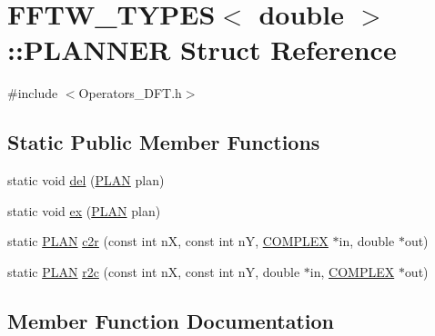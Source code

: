 \hypertarget{struct_f_f_t_w___t_y_p_e_s_3_01double_01_4_1_1_p_l_a_n_n_e_r}{}\section{F\+F\+T\+W\+\_\+\+T\+Y\+P\+E\+S$<$ double $>$\+:\+:P\+L\+A\+N\+N\+E\+R Struct Reference}
\label{struct_f_f_t_w___t_y_p_e_s_3_01double_01_4_1_1_p_l_a_n_n_e_r}


{\ttfamily \#include $<$Operators\+\_\+\+D\+F\+T.\+h$>$}

\subsection*{Static Public Member Functions}
\begin{DoxyCompactItemize}
\item 
static void \hyperlink{struct_f_f_t_w___t_y_p_e_s_3_01double_01_4_1_1_p_l_a_n_n_e_r_a8231993edffd6320aa232b1ceeb6c419}{del} (\hyperlink{struct_f_f_t_w___t_y_p_e_s_3_01double_01_4_a19c1538d166a5a9f01680c00253850ac}{P\+L\+A\+N} plan)
\item 
static void \hyperlink{struct_f_f_t_w___t_y_p_e_s_3_01double_01_4_1_1_p_l_a_n_n_e_r_afb9a4683a3d7eae99d24810d42c99d7a}{ex} (\hyperlink{struct_f_f_t_w___t_y_p_e_s_3_01double_01_4_a19c1538d166a5a9f01680c00253850ac}{P\+L\+A\+N} plan)
\item 
static \hyperlink{struct_f_f_t_w___t_y_p_e_s_3_01double_01_4_a19c1538d166a5a9f01680c00253850ac}{P\+L\+A\+N} \hyperlink{struct_f_f_t_w___t_y_p_e_s_3_01double_01_4_1_1_p_l_a_n_n_e_r_a95543598383c42e13b6df132d52cbd43}{c2r} (const int n\+X, const int n\+Y, \hyperlink{struct_f_f_t_w___t_y_p_e_s_3_01double_01_4_a9e1b7d8a842e1afab769065e5873f78c}{C\+O\+M\+P\+L\+E\+X} $\ast$in, double $\ast$out)
\item 
static \hyperlink{struct_f_f_t_w___t_y_p_e_s_3_01double_01_4_a19c1538d166a5a9f01680c00253850ac}{P\+L\+A\+N} \hyperlink{struct_f_f_t_w___t_y_p_e_s_3_01double_01_4_1_1_p_l_a_n_n_e_r_a5411b56942bafdb69ac0be113ca83b53}{r2c} (const int n\+X, const int n\+Y, double $\ast$in, \hyperlink{struct_f_f_t_w___t_y_p_e_s_3_01double_01_4_a9e1b7d8a842e1afab769065e5873f78c}{C\+O\+M\+P\+L\+E\+X} $\ast$out)
\end{DoxyCompactItemize}


\subsection{Member Function Documentation}
\hypertarget{struct_f_f_t_w___t_y_p_e_s_3_01double_01_4_1_1_p_l_a_n_n_e_r_a95543598383c42e13b6df132d52cbd43}{}
